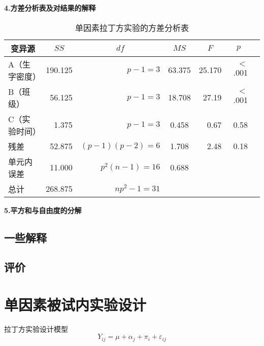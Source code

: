 \textbf{4.方差分析表及对结果的解释}

\begin{table}[h]
	\centering
	\caption{单因素拉丁方实验的方差分析表}
	{
		\begin{tabular}{lrrcrrr}
			\toprule
			\multicolumn{1}{c}{变异源} & \multicolumn{1}{c}{$SS$} & \multicolumn{1}{c}{$df$} & \multicolumn{1}{c}{$MS$} & \multicolumn{1}{c}{$F$} & \multicolumn{1}{c}{$p$} \\
			\midrule
			A（生字密度） & 190.125 & $p-1=3$ & 63.375 & 25.170 & $<$.001  \\
			B（班级） & 56.125 & $p-1=3$ & 18.708 & 27.19 & $<$.001   \\
			C（实验时间） & 1.375 & $p-1=3$ & 0.458 & 0.67 &  0.58  \\
			残差 & 52.875 & $(p-1)(p-2)=6$ & 1.708 & 2.48 & 0.18\\
			单元内误差 & 11.000 & $p^2(n-1)=16$ & 0.688\\
			\midrule
			总计 & 268.875 & $np^2-1=31$ & & &\\
			\bottomrule
		\end{tabular}
	}
\end{table}

\textbf{5.平方和与自由度的分解}

\subsection{一些解释}

\subsection{评价}

\section{单因素被试内实验设计}

拉丁方实验设计模型
\[ Y_{ij} = \mu + \alpha _j + \pi _i + \varepsilon _{ij} \]

